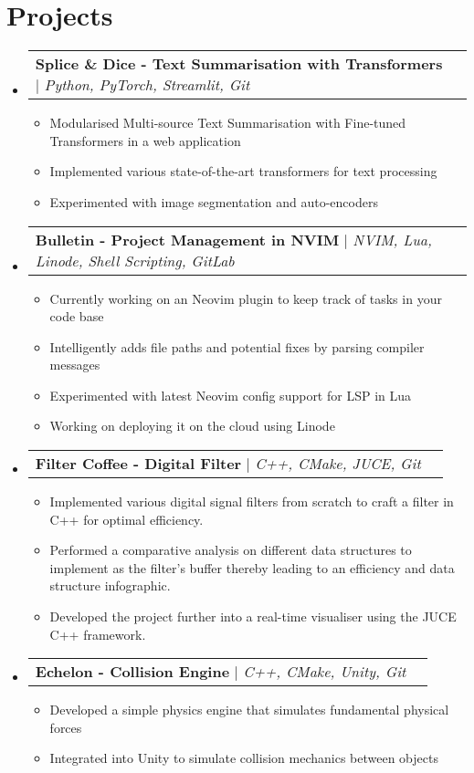 \documentclass[letterpaper,11pt]{article}
\makeatletter
\newcommand{\resumeItem}[1]{
  \item\small{
    {#1 \vspace{-2pt}}
  }
}
\newcommand{\resumeProjectHeading}[2]{
    \item
    \begin{tabular*}{0.97\textwidth}{l@{\extracolsep{\fill}}r}
      \small#1 & #2 \\
    \end{tabular*}\vspace{-7pt}
}
\newcommand{\resumeSubHeadingListStart}{\begin{itemize}[leftmargin=0.15in, label={}]}
\newcommand{\resumeSubHeadingListEnd}{\end{itemize}}
\newcommand{\resumeItemListStart}{\begin{itemize}}
\newcommand{\resumeItemListEnd}{\end{itemize}\vspace{-5pt}}
\makeatother
\begin{document}
\section{Projects}
    \resumeSubHeadingListStart

    \resumeProjectHeading
          {\textbf{Splice \& Dice - Text Summarisation with Transformers} $|$ \emph{Python, PyTorch, Streamlit, Git}}{}
          \resumeItemListStart
            \resumeItem{Modularised Multi-source Text Summarisation with Fine-tuned Transformers in a web application}
            \resumeItem{Implemented various state-of-the-art transformers for text processing}
            \resumeItem{Experimented with image segmentation and auto-encoders}
          \resumeItemListEnd

    \resumeProjectHeading
          {\textbf{Bulletin - Project Management in NVIM} $|$ \emph{NVIM, Lua, Linode, Shell Scripting, GitLab}}{}
          \resumeItemListStart
            \resumeItem{Currently working on an Neovim plugin to keep track of tasks in your code base}
            \resumeItem{Intelligently adds file paths and potential fixes by parsing compiler messages}
            \resumeItem{Experimented with latest Neovim config support for LSP in Lua}
            \resumeItem{Working on deploying it on the cloud using Linode}
          \resumeItemListEnd

    \resumeProjectHeading
          {\textbf{Filter Coffee - Digital Filter} $|$ \emph{C++, CMake, JUCE, Git}}{}
          \resumeItemListStart
            \resumeItem{Implemented various digital signal filters from scratch to craft a filter in C++ for optimal efficiency.}
            \resumeItem{Performed a comparative analysis on different data structures to implement as the filter’s buffer thereby leading to an efficiency and data structure infographic.}
            \resumeItem{Developed the project further into a real-time visualiser using the JUCE C++ framework.}
          \resumeItemListEnd

      \resumeProjectHeading
          {\textbf{Echelon - Collision Engine} $|$ \emph{C++, CMake, Unity, Git}}{}
          \resumeItemListStart
            \resumeItem{Developed a simple physics engine that simulates fundamental physical forces}
            \resumeItem{Integrated into Unity to simulate collision mechanics between objects}
          \resumeItemListEnd

    \resumeSubHeadingListEnd
\end{document}
